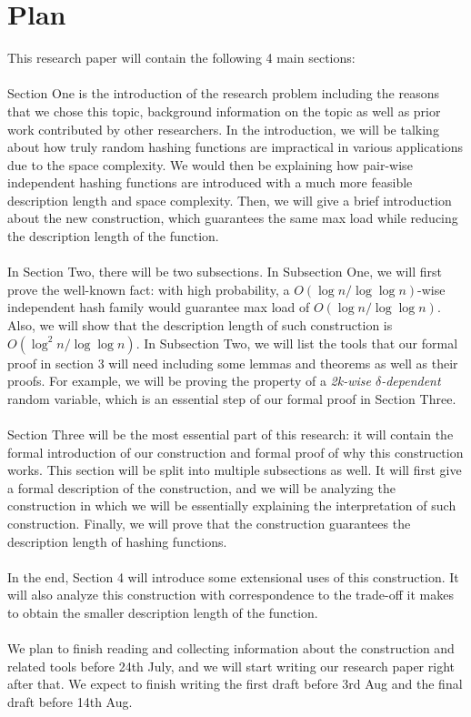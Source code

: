 \documentclass[letterpaper]{article} %
\begin{document}
	\newpage
	\section{Plan}
	This research paper will contain the following 4 main sections: \\\\
	Section One is the introduction of the research problem including the reasons that we chose this topic, background information on the topic as well as prior work contributed by other researchers. In the introduction, we will be talking about how truly random hashing functions are impractical in various applications due to the space complexity. We would then be explaining how pair-wise independent hashing functions are introduced with a much more feasible description length and space complexity. Then, we will give a brief introduction about the new construction, which guarantees the same max load while reducing the description length of the function. \\\\
	In Section Two, there will be two subsections. In Subsection One, we will first prove the well-known fact: with high probability, a $O(\log n/\log\log n)$-wise independent hash family would guarantee max load of $O(\log n/\log\log n)$. Also, we will show that the description length of such construction is $O(\log^2 n/\log\log n)$. In Subsection Two, we will list the tools that our formal proof in section 3 will need including some lemmas and theorems as well as their proofs. For example, we will be proving the property of a \textit{2k-wise $\delta$-dependent} random variable, which is an essential step of our formal proof in Section Three.
\\\\	Section Three will be the most essential part of this research: it will contain the formal introduction of our construction and formal proof of why this construction works. This section will be split into multiple subsections as well. It will first give a formal description of the construction, and we will be analyzing the construction in which we will be essentially explaining the interpretation of such construction. Finally, we will prove that the construction guarantees the description length of hashing functions.
\\\\ 	In the end, Section 4 will introduce some extensional uses of this construction. It will also analyze this construction with correspondence to the trade-off it makes to obtain the smaller description length of the function. \\\\
	We plan to finish reading and collecting information about the construction and related tools before 24th July, and we will start writing our research paper right after that. We expect to finish writing the first draft before 3rd Aug and the final draft before 14th Aug.
	
\end{document}
